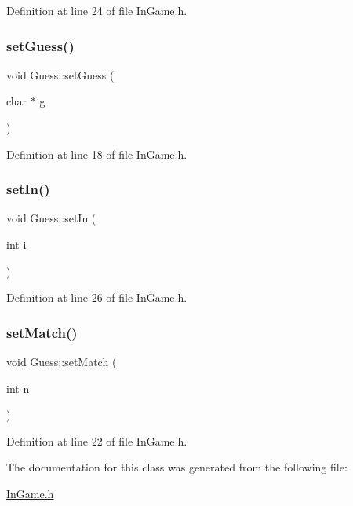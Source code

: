 Definition at line 24 of file In\+Game.\+h.

\hypertarget{class_guess_aca22edff1487c55b4263200c91054391}{}\label{class_guess_aca22edff1487c55b4263200c91054391} 
\subsubsection{\texorpdfstring{set\+Guess()}{setGuess()}}
{\footnotesize\ttfamily void Guess\+::set\+Guess (\begin{DoxyParamCaption}\item[{char $\ast$}]{g }\end{DoxyParamCaption})\hspace{0.3cm}{\ttfamily [inline]}}



Definition at line 18 of file In\+Game.\+h.

\hypertarget{class_guess_af7ede3729694ebe311a5fe8d5eade9be}{}\label{class_guess_af7ede3729694ebe311a5fe8d5eade9be} 
\subsubsection{\texorpdfstring{set\+In()}{setIn()}}
{\footnotesize\ttfamily void Guess\+::set\+In (\begin{DoxyParamCaption}\item[{int}]{i }\end{DoxyParamCaption})\hspace{0.3cm}{\ttfamily [inline]}}



Definition at line 26 of file In\+Game.\+h.

\hypertarget{class_guess_ac6400624eae122be1613ee38b3f5d10f}{}\label{class_guess_ac6400624eae122be1613ee38b3f5d10f} 
\subsubsection{\texorpdfstring{set\+Match()}{setMatch()}}
{\footnotesize\ttfamily void Guess\+::set\+Match (\begin{DoxyParamCaption}\item[{int}]{n }\end{DoxyParamCaption})\hspace{0.3cm}{\ttfamily [inline]}}



Definition at line 22 of file In\+Game.\+h.



The documentation for this class was generated from the following file\+:\begin{DoxyCompactItemize}
\item 
\hyperlink{_in_game_8h}{In\+Game.\+h}\end{DoxyCompactItemize}
